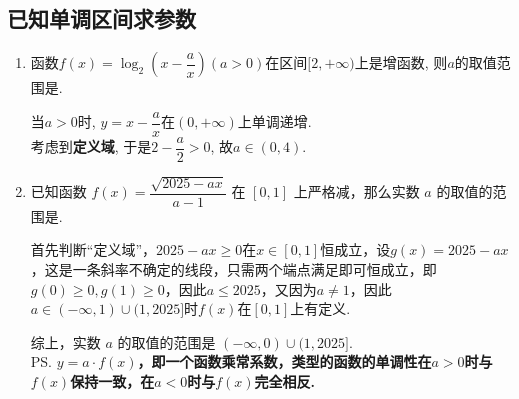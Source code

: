 \subsection*{已知单调区间求参数}
\begin{enumerate}
    \item 函数$f(x)=\log_2\left(x-\dfrac{a}{x}\right)(a>0)$在区间$[2,+\infty)$上是增函数, 则$a$的取值范围是. 
    \begin{jieda}
        当$a>0$时, $y=x-\dfrac{a}{x}$在$(0,+\infty)$上单调递增. \\
        考虑到\textbf{定义域}, 于是$2-\dfrac{a}{2}>0$, 故$a\in(0,4)$. 
    \end{jieda}
    \item 已知函数 $f(x)=\dfrac{\sqrt{2025-a x}}{a-1}$ 在 $[0,1]$ 上严格减，那么实数 $a$ 的取值的范围是\blkda[3]{$(-\infty, 0) \cup(1,2025]$}.
    \begin{jieda}
    首先判断“定义域”，$2025-ax \geq 0$在$x \in [0, 1]$恒成立，设$g(x) = 2025-ax$，这是一条斜率不确定的线段，只需两个端点满足即可恒成立，即$g(0) \geq 0, g(1) \geq 0$，因此$a \leq 2025$，又因为$a \neq 1$，因此$a \in (-\infty, 1) \cup (1, 2025]$时$f(x)$在$[0, 1]$上有定义.
    综上，实数 $a$ 的取值的范围是 $(-\infty, 0) \cup(1,2025]$. \\
    \ps \textbf{$y = a \cdot f(x)$，即一个函数乘常系数，类型的函数的单调性在$a > 0$时与$f(x)$保持一致，在$a < 0$时与$f(x)$完全相反.}
    \end{jieda}
\end{enumerate}

